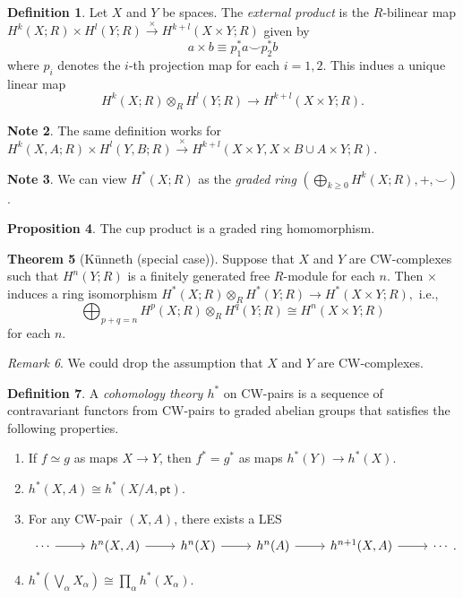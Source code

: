 \documentclass[10pt,letterpaper,cm]{nupset}
\theoremstyle{definition}
\newtheorem{definition}{Definition}[subsection]
\newtheorem{note}[definition]{Note}
\theoremstyle{theorem}
\newtheorem{theorem}[definition]{Theorem}
\newtheorem{prop}[definition]{Proposition}
\theoremstyle{remark}
\newtheorem{remark}[definition]{Remark}
\newcommand{\1}{\mathbb{1}}
\newcommand{\0}{\vec 0}
\newcommand{\pt}{\mathsf{pt}}
\begin{document}
\begin{definition}
Let $X$ and $Y$ be spaces. The \textit{external product} is the $R$-bilinear map $H^k(X; R) \times H^l(Y; R) \overset{\times}{\longrightarrow} H^{k+l}(X\times Y; R)$ given by $$ a\times b \equiv p_1^{\ast}{a} \smile p_2^{\ast}{b}$$ where $p_i$ denotes the $i$-th projection map for each $i=1,2$. This indues a unique linear map  $$H^k(X; R) \otimes_R H^l(Y; R) \to H^{k+l}(X\times Y; R).$$
\end{definition}

\begin{note}
The same definition works for $H^k(X, A; R) \times H^l(Y, B; R) \overset{\times}{\longrightarrow} H^{k+l}(X\times Y, X\times B \cup A \times Y; R)$.
\end{note}

\begin{note}
We can view $H^{\ast}(X; R)$ as the \textit{graded ring} $(\bigoplus_{k\geq 0} H^k(X; R), +, \smile)$. 
\end{note}

\begin{prop}
The cup product is a graded ring homomorphism. 
\end{prop}

\begin{theorem}[K\"unneth (special case)]
Suppose that  $X$ and $Y$ are CW-complexes such that $H^n(Y; R)$ is a finitely generated free $R$-module for each $n$. Then $\times$ induces a ring isomorphism $H^{\ast}(X; R) \otimes_R H^{\ast}(Y; R) \to H^{\ast}(X\times Y; R),$ i.e.,  $$\bigoplus_{p+q= n} H^p(X; R) \otimes_R H^q(Y; R) \cong H^n(X\times Y; R)$$ for each $n$. 
\end{theorem}

\begin{remark}
We could drop the assumption that $X$ and $Y$ are CW-complexes.
\end{remark}

\begin{definition}
A \textit{cohomology theory $h^{\ast}$} on CW-pairs is a sequence of contravariant functors from CW-pairs to graded abelian groups that satisfies the following properties.
\begin{enumerate}
\item If $f \simeq g$ as maps $X\to Y$, then $f^{\ast} = g^{\ast}$ as maps $h^{\ast}(Y) \to h^{\ast}(X)$.
\item $h^{\ast}(X, A) \cong h^{\ast}(X/A, \pt)$.
\item For any CW-pair $(X, A)$, there exists a LES
\[
\begin{tikzcd}
\cdots \arrow[r] & h^n(X, A) \arrow[r] & h^n(X) \arrow[r] & h^n(A) \arrow[r] & h^{n+1}(X, A) \arrow[r] & \cdots
\end{tikzcd}.
\]
\item $h^{\ast}(\bigvee_{\alpha} X_{\alpha}) \cong \prod_{\alpha} h^{\ast}(X_{\alpha})$.
\end{enumerate}
\end{definition}
\end{document}
